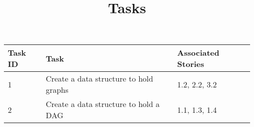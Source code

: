 \documentclass{article}
\begin{document}
	\title{Tasks}
	\date{}
	\maketitle
	\begin{tabular}{| l | p{5cm} | l |}
	\hline
	Task ID & Task & Associated Stories \\
	\hline
	1 & Create a data structure to hold graphs & 1.2, 2.2, 3.2 \\
	\hline
	2 &  Create a data structure to hold a DAG & 1.1, 1.3, 1.4\\
	\hline
	
	\end{tabular}
\end{document}
